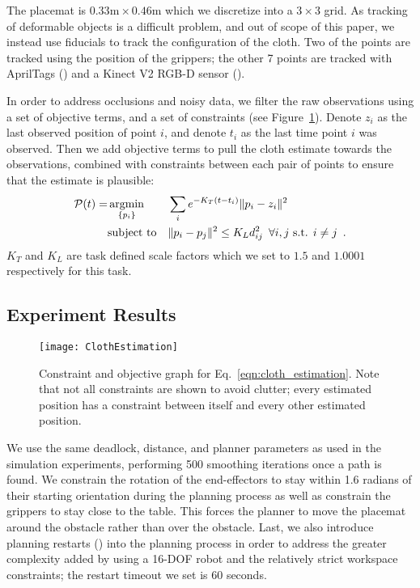The placemat is $0.33\text{m} \times 0.46\text{m}$ which we discretize into a $3 \times 3$ grid. As tracking of deformable objects is a difficult problem, and out of scope of this paper, we instead use fiducials to track the configuration of the cloth. Two of the points are tracked using the position of the grippers; the other 7 points are tracked with AprilTags (\cite{olson2011tags}) and a Kinect V2 RGB-D sensor (\cite{iai_kinect2}).

In order to address occlusions and noisy data, we filter the raw observations using a set of objective terms, and a set of constraints (see Figure~\ref{fig:cloth_estimation}). Denote $z_i$ as the last observed position of point $i$, and denote $t_i$ as the last time point $i$ was observed. Then we add objective terms to pull the cloth estimate towards the observations, combined with constraints between each pair of points to ensure that the estimate is plausible:
\begin{equation}
\begin{aligned}
    \mathcal{P}(t) = &\operatorname*{argmin}_{\{ p_i \}} 
            & & \sum_i e^{-K_T(t - t_i)} \| p_i - z_i \|^2 \\
            & \text{subject to}
            & & \| p_i - p_j \|^2 \leq K_L d_{ij}^2 \enspace \forall i, j \text{ s.t. } i \neq j \enspace .
\end{aligned}
\label{eqn:cloth_estimation}
\end{equation}
$K_T$ and $K_L$ are task defined scale factors which we set to $1.5$ and $1.0001$ respectively for this task.

\subsection{Experiment Results}

\begin{figure}[ht]
    \centering
    \texttt{[image: ClothEstimation]}
    \caption{Constraint and objective graph for Eq.~\eqref{eqn:cloth_estimation}. Note that not all constraints are shown to avoid clutter; every estimated position has a constraint between itself and every other estimated position.}
    \label{fig:cloth_estimation}
\end{figure}


We use the same deadlock, distance, and planner parameters as used in the simulation experiments, performing 500 smoothing iterations once a path is found. We constrain the rotation of the end-effectors to stay within 1.6 radians of their starting orientation during the planning process as well as constrain the grippers to stay close to the table. This forces the planner to move the placemat around the obstacle rather than over the obstacle. Last, we also introduce planning restarts (\cite{Wedge2008}) into the planning process in order to address the greater complexity added by using a 16-DOF robot and the relatively strict workspace constraints; the restart timeout we set is 60 seconds.


